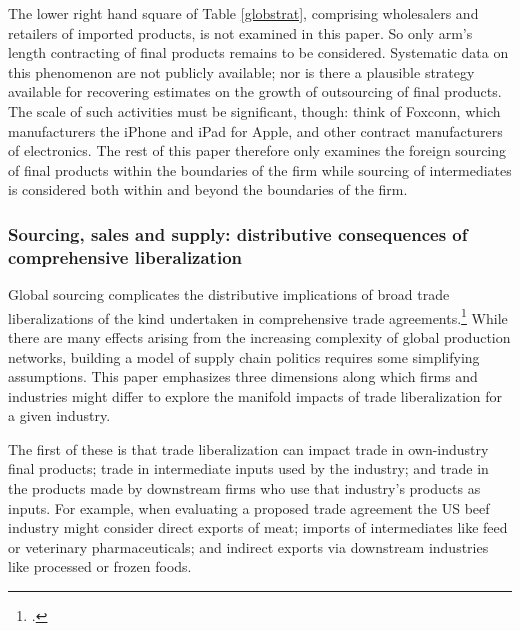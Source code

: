 \documentclass[hidelinks,12pt,letter]{article}
\begin{document}
The lower right hand square of Table \ref{globstrat}, comprising wholesalers and retailers of imported products, is not examined in this paper. So only arm's length contracting of final products remains to be considered. Systematic data on this phenomenon are not publicly available; nor is there a plausible strategy available for recovering estimates on the growth of outsourcing of final products. The scale of such activities must be significant, though: think of Foxconn, which manufacturers the iPhone and iPad for Apple, and other contract manufacturers of electronics. The rest of this paper therefore only examines the foreign sourcing of final products within the boundaries of the firm while sourcing of intermediates is considered both within and beyond the boundaries of the firm.

\subsubsection*{Sourcing, sales and supply: distributive consequences of comprehensive liberalization}
Global sourcing complicates the distributive implications of broad trade liberalizations of the kind undertaken in comprehensive trade agreements.\footnote{\citealt{antras2012offshoring}.} While there are many effects arising from the increasing complexity of global production networks, building a model of supply chain politics requires some simplifying assumptions. This paper emphasizes three dimensions along which firms and industries might differ to explore the manifold impacts of trade liberalization for a given industry. 

The first of these is that trade liberalization can impact trade in own-industry final products; trade in intermediate inputs used by the industry; and trade in the products made by downstream firms who use that industry's products as inputs. For example, when evaluating a proposed trade agreement the US beef industry might consider direct exports of meat; imports of intermediates like feed or veterinary pharmaceuticals; and indirect exports via downstream industries like processed or frozen foods. %
\end{document}
